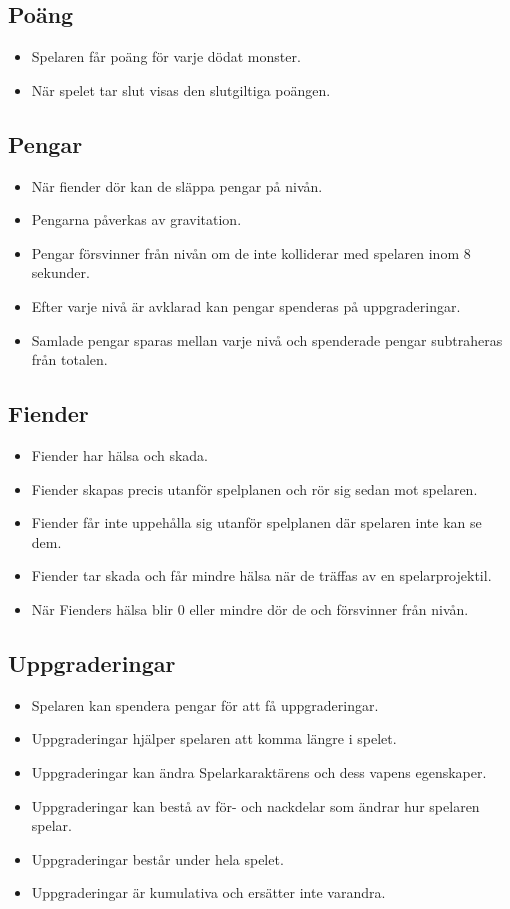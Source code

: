 \documentclass{TDP005mall}
\begin{document}
\subsection{Poäng}
\begin{itemize}
\item Spelaren får poäng för varje dödat monster.
\item När spelet tar slut visas den slutgiltiga poängen.
\end{itemize}

\subsection{Pengar}
\begin{itemize}
\item När fiender dör kan de släppa pengar på nivån.
\item Pengarna påverkas av gravitation.
\item Pengar försvinner från nivån om de inte kolliderar med spelaren inom 8 sekunder.
\item Efter varje nivå är avklarad kan pengar spenderas på uppgraderingar.
\item Samlade pengar sparas mellan varje nivå och spenderade pengar subtraheras från totalen. 
\end{itemize}

\subsection{Fiender}
\begin{itemize}
\item Fiender har hälsa och skada.
\item Fiender skapas precis utanför spelplanen och rör sig sedan mot spelaren.
\item Fiender får inte uppehålla sig utanför spelplanen där spelaren inte kan se dem.
\item Fiender tar skada och får mindre hälsa när de träffas av en spelarprojektil.
\item När Fienders hälsa blir 0 eller mindre dör de och försvinner från nivån.
\end{itemize}

\subsection{Uppgraderingar}
\begin{itemize}
\item Spelaren kan spendera pengar för att få uppgraderingar.
\item Uppgraderingar hjälper spelaren att komma längre i spelet.
\item Uppgraderingar kan ändra Spelarkaraktärens och dess vapens egenskaper.
\item Uppgraderingar kan bestå av för- och nackdelar som ändrar hur spelaren spelar.
\item Uppgraderingar består under hela spelet.
\item Uppgraderingar är kumulativa och ersätter inte varandra.
\end{itemize}
\end{document}
